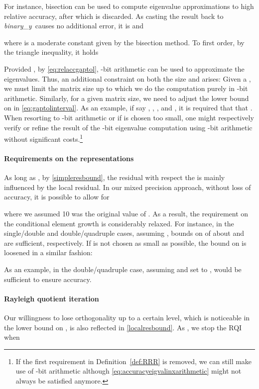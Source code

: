 \documentclass[final]{siamltex}
\newcommand{\binaryy}{{\it binary\_\hspace*{0pt}y}}
\begin{document}
For instance, bisection can be used to compute eigenvalue approximations
 to high relative accuracy, after which  is discarded. As
casting the result back to \binaryy\ causes no additional error, it is  and

where  is a moderate constant given by the bisection method. To first order, by the
triangle inequality, it holds

Provided , by \eqref{eq:relaccgaptol}, -bit arithmetic can be used to approximate the
eigenvalues. Thus, an additional constraint on both the size  and
 arises:
Given a , we must limit the matrix size up to which we do the
computation purely in -bit arithmetic. Similarly, for a given matrix size, we need to adjust
the lower bound on  in \eqref{eq:gaptolinterval}. As an example, if
say , , , and , it is required that that . 
When resorting to -bit arithmetic or if  is chosen too small, one might
respectively verify or refine the result of the -bit eigenvalue computation using
-bit arithmetic without significant costs.\footnote{If the first
  requirement in Definition~\ref{def:RRR} is 
  removed, we can still make use of -bit arithmetic although
  \eqref{eq:accuracyeigvalinxarithmetic} might
  not always be satisfied anymore.} 

\paragraph{Requirements on the representations}
As long as , by \eqref{simpleresbound},
the residual with respect the  is mainly influenced by the local
residual. In our mixed precision approach, without loss of accuracy, it
is possible to allow for  

where we assumed 10 was the original value of . As a result, the
requirement on the conditional element growth is considerably relaxed. 
For instance, in the single/double and double/quadruple cases,
assuming , bounds on  of about  and  are
sufficient, respectively. 
If  is
not chosen as small as possible, the bound on  is loosened in a
similar fashion:

As an example, in the double/quadruple case, assuming  and
 set to ,  would be sufficient to ensure
accuracy. 

\paragraph{Rayleigh quotient iteration}
Our willingness to lose orthogonality up to a certain level, which is
noticeable in the lower bound on , 
is also reflected in \eqref{localresbound}. 
As , we stop the RQI when
\end{document}
